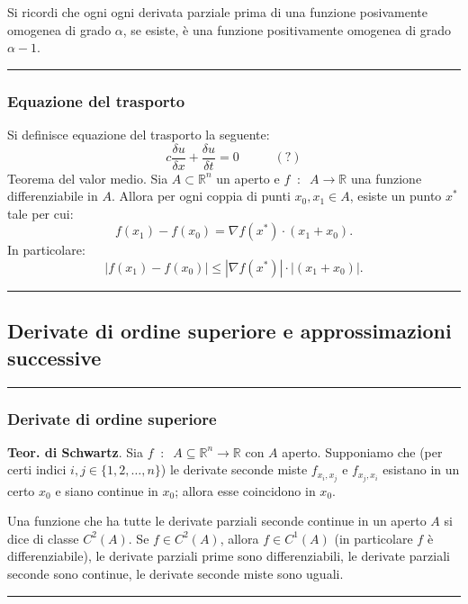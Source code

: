 Si ricordi che ogni ogni derivata parziale prima di una funzione posivamente omogenea di grado $\alpha$, se esiste, è una funzione positivamente omogenea di grado $\alpha -1$. \newline
\rule{\textwidth}{0.4pt}
\subsubsection*{Equazione del trasporto}
Si definisce equazione del trasporto la seguente:
\[
    c \frac{\delta u}{\delta x} + \frac{\delta u}{\delta t} = 0 \;\;\;\;\; \;\;\;\;\; (?)
\]
\newline
Teorema del valor medio. Sia $A \subset \mathbb{R}^n$ un aperto e $f \;\;:\;\; A \rightarrow \mathbb{R}$ una funzione differenziabile in $A$. Allora per ogni coppia di punti $x_0, x_1 \in A$, esiste un punto $x^*$ tale per cui:
\[
    f(x_1)- f(x_0) = \nabla f(x^*) \cdot  (x_1 + x_0).
\]
In particolare:
\[
    |f(x_1) - f(x_0)| \leq |\nabla f(x^*)| \cdot |(x_1 + x_0)|.
\]
\rule{\textwidth}{2pt}

\subsection*{Derivate di ordine superiore e approssimazioni successive}
\rule{\textwidth}{0.4pt}
\subsubsection*{Derivate di ordine superiore}
\begin{tcolorbox}
\textbf{Teor. di Schwartz}. Sia $f \;\;:\;\; A \subseteq \mathbb{R}^n \rightarrow \mathbb{R}$ con $A$ aperto. Supponiamo che (per certi indici $i,j \in \{1,2,\dots,n\}$) le derivate seconde miste $f_{x_i, x_j}$ e $f_{x_j, x_i}$ esistano in un certo $x_0$ e siano continue in $x_0$; allora esse coincidono in $x_0$.\newline
\end{tcolorbox}
Una funzione che ha tutte le derivate parziali seconde continue in un aperto $A$ si dice di classe $C^2(A)$.\newline
Se $f \in C^2(A)$, allora $f \in C^1(A)$ (in particolare $f$ è differenziabile), le derivate parziali prime sono differenziabili, le derivate parziali seconde sono continue, le derivate seconde miste sono uguali.
\rule{\textwidth}{2pt}
